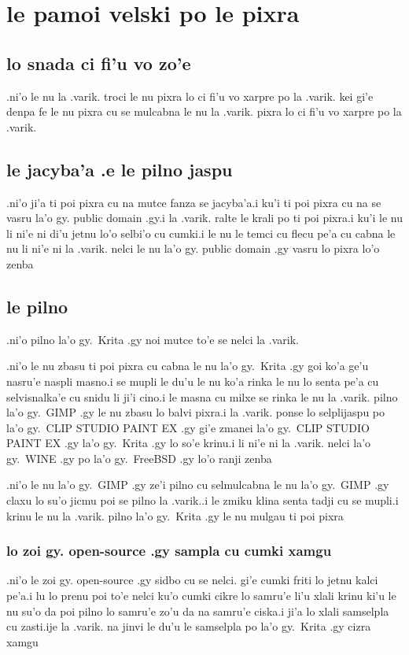 \documentclass{report}
\begin{document}
\section{le pamoi velski po le pixra}
\subsection{lo snada ci fi'u vo zo'e}
.ni'o le nu la .varik. troci le nu pixra lo ci fi'u vo xarpre po la .varik. kei gi'e denpa fe le nu pixra cu se mulcabna le nu la .varik. pixra lo ci fi'u vo xarpre po la .varik.
\subsection{le jacyba'a .e le pilno jaspu}
.ni'o ji'a ti poi pixra cu na mutce fanza se jacyba'a\@  .i ku'i ti poi pixra cu na se vasru la'o gy. public domain .gy\@  .i la .varik. ralte le krali po ti poi pixra\@  .i ku'i le nu li ni'e ni di'u jetnu lo'o selbi'o cu cumki\@  .i le nu le temci cu flecu pe'a cu cabna le nu li ni'e ni la .varik. nelci le nu la'o gy. public domain .gy vasru lo pixra lo'o zenba
\subsection{le pilno}
.ni'o pilno la'o gy.\ Krita .gy noi mutce to'e se nelci la .varik.

.ni'o le nu zbasu ti poi pixra cu cabna le nu la'o gy.\ Krita .gy goi ko'a ge'u nasru'e naspli masno\@  .i se mupli le du'u le nu ko'a rinka le nu lo senta pe'a cu selvisnalka'e cu snidu li ji'i cino\@  .i le masna cu milxe se rinka le nu la .varik. pilno la'o gy.\ GIMP .gy le nu zbasu lo balvi pixra\@  .i la .varik. ponse lo selplijaspu po la'o gy.\ CLIP STUDIO PAINT EX .gy gi'e zmanei la'o gy.\ CLIP STUDIO PAINT EX .gy la'o gy.\ Krita .gy lo so'e krinu\@  .i li ni'e ni la .varik. nelci la'o gy.\ WINE .gy po la'o gy.\ FreeBSD .gy lo'o ranji zenba

.ni'o le nu la'o gy.\ GIMP .gy ze'i pilno cu selmulcabna le nu la'o gy.\ GIMP .gy claxu lo su'o jicmu poi se pilno la .varik.\@  .i le zmiku klina senta tadji cu se mupli\@  .i krinu le nu la .varik. pilno la'o gy.\ Krita .gy le nu mulgau ti poi pixra
\subsubsection{lo zoi gy. open-source .gy sampla cu cumki xamgu}
.ni'o le zoi gy. open-source .gy sidbo cu se nelci. gi'e cumki friti lo jetnu kalci pe'a\@\@  .i lu lo prenu poi to'e nelci ku'o cumki cikre lo samru'e li'u xlali krinu ki'u le nu su'o da poi pilno lo samru'e zo'u da na samru'e ciska\@\@  .i ji'a lo xlali samselpla cu zasti\@  .ije la .varik. na jinvi le du'u le samselpla po la'o gy.\ Krita .gy cizra xamgu
\end{document}
